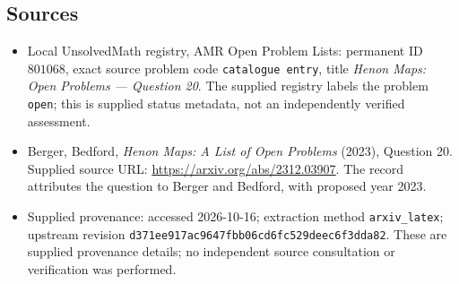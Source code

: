\documentclass[11pt]{article}
\begin{document}
\subsection{Sources}
\begin{itemize}
\item Local UnsolvedMath registry, AMR Open Problem Lists: permanent ID \(801068\), exact source problem code \texttt{catalogue entry}, title \emph{Henon Maps: Open Problems --- Question 20}. The supplied registry labels the problem \texttt{open}; this is supplied status metadata, not an independently verified assessment.
\item Berger, Bedford, \emph{Henon Maps: A List of Open Problems} (2023), Question 20. Supplied source URL: \url{https://arxiv.org/abs/2312.03907}. The record attributes the question to Berger and Bedford, with proposed year 2023.
\item Supplied provenance: accessed 2026-10-16; extraction method \texttt{arxiv\_latex}; upstream revision \texttt{d371ee917ac9647fbb06cd6fc529deec6f3dda82}. These are supplied provenance details; no independent source consultation or verification was performed.
\end{itemize}
\end{document}
